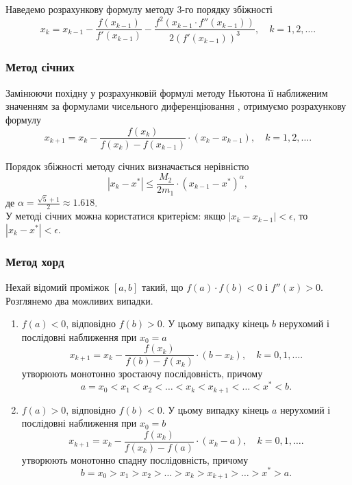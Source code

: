 \begin{remark}
	Наведемо розрахункову формулу методу 3-го порядку збіжності
	\begin{equation}
		\label{eq:6}
		x_k = x_{k-1} - \frac{f(x_{k-1})}{f'(x_{k-1})} - \frac{f^2(x_{k-1} \cdot f''(x_{k-1}))}{2 (f'(x_{k-1}))^3}, \quad k = 1, 2, \ldots .
	\end{equation}
\end{remark}

\subsubsection{Метод січних}

Замінюючи похідну у розрахунковій формулі методу Ньютона її наближеним значенням за формулами чисельного диференціювання , отримуємо розрахункову формулу
\begin{equation}
	\label{eq:7}
	x_{k+1} = x_k - \frac{f(x_k)}{f(x_k) - f(x_{k-1})} \cdot (x_k - x_{k-1}), \quad k = 1, 2, \ldots.
\end{equation}

Порядок збіжності методу січних визначається нерівністю
\[ |x_k - x^*| \le \frac{M_2}{2m_1} \cdot (x_{k-1} - x^*)^\alpha, \]
де $\alpha = \frac{\sqrt{5} + 1}{2} \approx 1.618$. \\

У методі січних можна користатися критерієм: якщо $|x_k - x_{k-1}| < \epsilon$, то $|x_k - x^*| < \epsilon$.

\subsubsection{Метод хорд}

Нехай відомий проміжок $[a, b]$ такий, що $f(a) \cdot f(b) < 0$ і $f''(x) > 0$. Розглянемо два можливих випадки.
\begin{enumerate}
	\item $f(a) < 0$, відповідно $f(b) > 0$. У цьому випадку кінець $b$ нерухомий і послідовні наближення при $x_0 = a$
	\begin{equation}
	 	\label{eq:8}
	 	x_{k+1} = x_k - \frac{f(x_k)}{f(b) - f(x_k)} \cdot (b - x_k), \quad k = 0, 1, \ldots .
	\end{equation} 
	утворюють монотонно зростаючу послідовність, причому 
	\[ a = x_0 < x_1 < x_2 < \ldots < x_k < x_{k+1} < \ldots < x^* < b. \]
	
	\item $f(a) > 0$, відповідно $f(b) < 0$. У цьому випадку кінець $a$ нерухомий і послідовні наближення при $x_0 = b$
	\begin{equation}
	 	\label{eq:8}
	 	x_{k+1} = x_k - \frac{f(x_k)}{f(x_k) - f(a)} \cdot (x_k - a), \quad k = 0, 1, \ldots .
	\end{equation}
	утворюють монотонно спадну послідовність, причому 
	\[ b = x_0 > x_1 > x_2 > \ldots > x_k > x_{k+1} > \ldots > x^* > a. \]
\end{enumerate}

